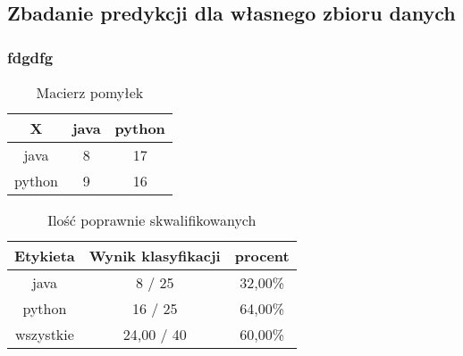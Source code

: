 \documentclass{classrep}
\begin{document}
\newpage
\subsection{Zbadanie predykcji dla własnego zbioru danych}

\subsubsection{fdgdfg}
\begin{table}[h]
\centering
\begin{tabular}{|c|c|c|}
\hline
 X  & java & python\\
\hline
java & 8 & 17\\
\hline
python & 9 & 16\\
\hline
\end{tabular}
\caption{Macierz pomyłek}\end{table}

\begin{table}[h]
\centering
\begin{tabular}{|c|c|c|}
\hline
Etykieta & Wynik klasyfikacji & procent\\
\hline
java & 8 / 25 & 32,00\%\\
\hline
python & 16 / 25 & 64,00\%\\
\hline
wszystkie & 24,00 / 40 & 60,00\%\\
\hline
\end{tabular}
\caption{Ilość poprawnie skwalifikowanych}\end{table}
\end{document}
